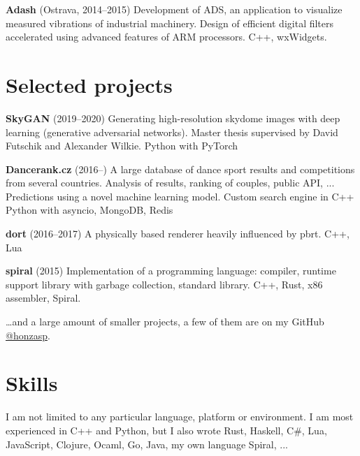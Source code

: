 \documentclass[11pt,a4paper]{article}
\begin{document}
\begin{multicols}{2}
\textbf{Adash} (Ostrava, 2014–2015)
  \newline Development of ADS, an application to visualize measured vibrations
  of industrial machinery.
  \newline Design of efficient digital filters accelerated using advanced
  features of ARM processors.
  \newline C++, wxWidgets.


\section*{Selected projects}

\textbf{SkyGAN} (2019–2020)
  \newline Generating high-resolution skydome images with deep learning
  (generative adversarial networks).
  \newline Master thesis supervised by David Futschik and Alexander Wilkie.
  \newline Python with PyTorch

\textbf{Dancerank.cz} (2016–)
  \newline A large database of dance sport results and competitions from several
  countries.
  \newline Analysis of results, ranking of couples, public API, ...
  \newline Predictions using a novel machine learning model.
  \newline Custom search engine in C++
  \newline Python with asyncio, MongoDB, Redis

\textbf{dort} (2016–2017)
  \newline A physically based renderer heavily influenced by pbrt.
  \newline C++, Lua

\textbf{spiral} (2015)
  \newline Implementation of a programming language: compiler, runtime support
  library with garbage collection, standard library.
  \newline C++, Rust, x86 assembler, Spiral.

\ldots{}and a large amount of smaller projects, a few of them are on my GitHub 
\href{https://github.com/honzasp}{@honzasp}.

\section*{Skills}

I am not limited to any particular language, platform or environment. I am most
experienced in C++ and Python, but I also wrote Rust,
{\small Haskell, C\#, Lua,}
{\footnotesize JavaScript,}
{\scriptsize Clojure, Ocaml, Go, Java, my own language Spiral, ...}


\end{multicols}
\end{document}
